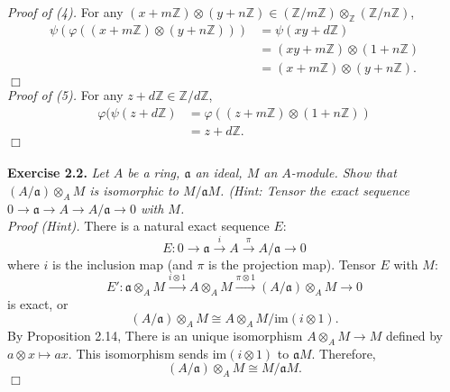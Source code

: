 \documentclass{article}
\begin{document}
\emph{Proof of (4).}
For any $(x + m\mathbb{Z}) \otimes (y + n\mathbb{Z}) \in
(\mathbb{Z}/m\mathbb{Z}) \otimes_{\mathbb{Z}} (\mathbb{Z}/n\mathbb{Z})$,
\begin{align*}
  \psi(\varphi((x + m\mathbb{Z}) \otimes (y + n\mathbb{Z})))
  &= \psi(xy + d\mathbb{Z}) \\
  &= (xy + m\mathbb{Z}) \otimes (1 + n\mathbb{Z}) \\
  &= (x + m\mathbb{Z}) \otimes (y + n\mathbb{Z}).
\end{align*}
$\Box$ \\

\emph{Proof of (5).}
For any $z + d\mathbb{Z} \in \mathbb{Z}/d\mathbb{Z}$,
\begin{align*}
  \varphi(\psi(z + d\mathbb{Z})
  &= \varphi((z + m\mathbb{Z}) \otimes (1 + n\mathbb{Z})) \\
  &= z + d\mathbb{Z}.
\end{align*}
$\Box$ \\\\






\textbf{Exercise 2.2.}
\emph{Let $A$ be a ring, $\mathfrak{a}$ an ideal, $M$ an $A$-module.
Show that $(A/\mathfrak{a}) \otimes_A M$ is isomorphic to $M/\mathfrak{a}M$.
(Hint: Tensor the exact sequence
$0
\rightarrow \mathfrak{a}
\rightarrow A
\rightarrow A/\mathfrak{a}
\rightarrow 0$ with $M$.} \\

\emph{Proof (Hint).}
There is a natural exact sequence $E$:
$$E: 0
\rightarrow \mathfrak{a}
\xrightarrow{i} A
\xrightarrow{\pi} A/\mathfrak{a}
\rightarrow 0$$
where $i$ is the inclusion map (and $\pi$ is the projection map).
Tensor $E$ with $M$:
$$E':
\mathfrak{a} \otimes_{A} M
\xrightarrow{i \otimes 1} A \otimes_{A} M
\xrightarrow{\pi \otimes 1} (A/\mathfrak{a}) \otimes_{A} M
\rightarrow 0$$
is exact, or
$$(A/\mathfrak{a}) \otimes_{A} M \cong A \otimes_{A} M/\text{im}(i \otimes 1).$$
By Proposition 2.14,
There is an unique isomorphism $A \otimes_{A} M \to M$ defined by
$a \otimes x \mapsto ax$.
This isomorphism sends $\text{im}(i \otimes 1)$ to $\mathfrak{a}M$.
Therefore,
$$
(A/\mathfrak{a}) \otimes_{A} M \cong M/\mathfrak{a}M.$$
$\Box$ \\
\end{document}

